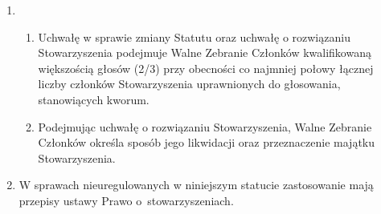 \documentclass[chapterprefix,notitlepage]{article}
\begin{document}
\begin{enumerate}
	\item \begin{enumerate}
		\item Uchwałę w sprawie zmiany Statutu oraz uchwałę o rozwiązaniu Stowarzyszenia podejmuje Walne Zebranie Członków kwalifikowaną większością głosów (2/3) przy obecności co najmniej połowy łącznej liczby członków Stowarzyszenia uprawnionych do głosowania, stanowiących kworum.
		\item Podejmując uchwałę o rozwiązaniu Stowarzyszenia, Walne Zebranie Członków określa sposób jego likwidacji oraz przeznaczenie majątku Stowarzyszenia.
	\end{enumerate}		
	
	\item  W sprawach nieuregulowanych w niniejszym statucie zastosowanie mają przepisy ustawy Prawo o~stowarzyszeniach.
			
\end{enumerate}
\end{document}
